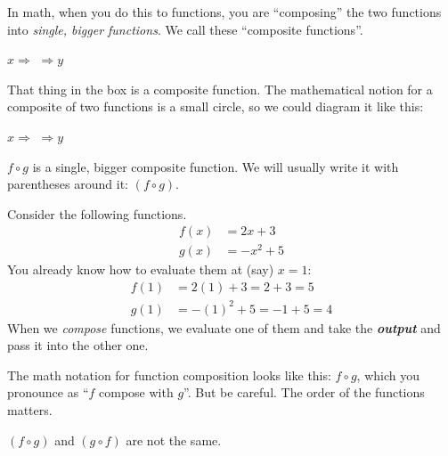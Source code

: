 \documentclass[fleqn,letterpaper,12pt,printwatermark=false]{memoir}
\begin{document}
\begin{myLesson}
    In math, when you do this to functions,
    you are ``composing'' the two functions
    into \emph{single, bigger functions}.
    We call these ``composite functions''.

    \begin{center}
    \vspace{1em}
    \(
        x
        \Longrightarrow
    \)
    \(
        \Longrightarrow
        y
    \)
    \vspace{1em}
    \end{center}

    That thing in the box is a composite function.
    The mathematical notion for a composite of two functions is a small circle,
    so we could diagram it like this:

    \begin{center}
        \vspace{1em}
        \(
            x
            \Longrightarrow
        \)
        \(
            \Longrightarrow
            y
        \)
        \vspace{1em}
        \end{center}

    $f\circ g$ is a single, bigger composite function. We will usually write it with parentheses around it:
    $(f\circ g)$.
\end{myLesson}

\begin{myLesson}[][1]
    Consider the following functions.
    \begin{align*}
        f(x) &= 2x + 3 \\
        g(x) &= -x^2 + 5
    \end{align*}
    You already know how to evaluate them at (say) $x=1$:
    \begin{align*}
        f(1) &= 2(1) + 3   = 2+3    = 5\\
        g(1) &= -(1)^2 + 5 = -1 + 5 = 4
    \end{align*}
    When we \emph{compose} functions, 
    we evaluate one of them and take the {\bfseries\itshape output} and pass it 
    into the other one.

    The math notation for function composition looks like this:
    $f \circ g$,
    which you pronounce as ``$f$ compose with $g$''. 
    But be careful.
    The order of the functions matters.
    \begin{myLessonBox}[3in]
        $(f \circ g)$ 
        and
        $(g \circ f)$ 
        are not the same.
    \end{myLessonBox}
\end{myLesson}
\end{document}
